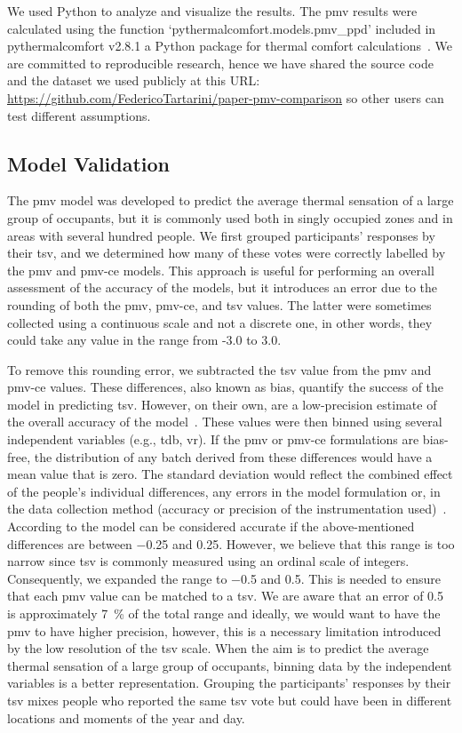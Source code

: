 We used Python to analyze and visualize the results.
The \ac{pmv} results were calculated using the function `pythermalcomfort.models.pmv\_ppd' included in pythermalcomfort v2.8.1 a Python package for thermal comfort calculations~\cite{Tartarini2020a}.
We are committed to reproducible research, hence we have shared the source code and the dataset we used publicly at this URL: \url{https://github.com/FedericoTartarini/paper-pmv-comparison} so other users can test different assumptions.

\subsection{Model Validation}\label{subsec:model-validation}
The \ac{pmv} model was developed to predict the average thermal sensation of a large group of occupants, but it is commonly used both in singly occupied zones and in areas with several hundred people.
We first grouped participants' responses by their \ac{tsv}, and we determined how many of these votes were correctly labelled by the \ac{pmv} and \ac{pmv-ce} models.
This approach is useful for performing an overall assessment of the accuracy of the models, but it introduces an error due to the rounding of both the \ac{pmv}, \ac{pmv-ce}, and \ac{tsv} values.
The latter were sometimes collected using a continuous scale and not a discrete one, in other words, they could take any value in the range from -3.0 to 3.0.

To remove this rounding error, we subtracted the \ac{tsv} value from the \ac{pmv} and \ac{pmv-ce} values.
These differences, also known as bias, quantify the success of the model in predicting \ac{tsv}.
However, on their own, are a low-precision estimate of the overall accuracy of the model~\cite{Humphreys2002}.
These values were then binned using several independent variables (e.g., \ac{tdb}, \ac{vr}).
If the \ac{pmv} or \ac{pmv-ce} formulations are bias-free, the distribution of any batch derived from these differences would have a mean value that is zero.
The standard deviation would reflect the combined effect of the people's individual differences, any errors in the model formulation or, in the data collection method (accuracy or precision of the instrumentation used)~\cite{Humphreys2002}.
According to  the model can be considered accurate if the above-mentioned differences are between \num{-0.25} and \num{0.25}.
However, we believe that this range is too narrow since \ac{tsv} is commonly measured using an ordinal scale of integers.
Consequently, we expanded the range to \num{-.5} and \num{0.5}.
This is needed to ensure that each \ac{pmv} value can be matched to a \ac{tsv}.
We are aware that an error of \num{.5} is approximately \qty{7}{\percent} of the total range and ideally, we would want to have the \ac{pmv} to have higher precision, however, this is a necessary limitation introduced by the low resolution of the \ac{tsv} scale.
When the aim is to predict the average thermal sensation of a large group of occupants, binning data by the independent variables is a better representation.
Grouping the participants' responses by their \ac{tsv} mixes people who reported the same \ac{tsv} vote but could have been in different locations and moments of the year and day.

